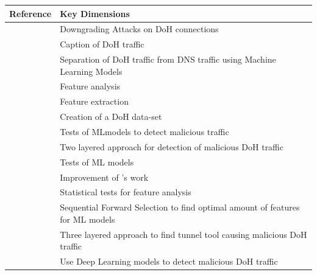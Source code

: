 \begin{center}
\begin{tabular}{ |c|l| }
\hline
Reference & Key Dimensions \\
\hline
 \cite{HuangEtAl_DoHDowngradeAttack} & Downgrading Attacks on DoH connections\\ 
 \hline
 \cite{Hjelm_ANewNeedle} & Caption of DoH traffic\\
 \hline
 \multirow{2}{*}{\cite{VeshkinEtAl_DoHInsightML}} & Separation of DoH traffic from DNS traffic using Machine Learning Models\\
 & Feature analysis\\
 \hline
 \multirow{2}{*}{\cite{montazerishatoori2020anomaly}} & Feature extraction \\ & Creation of a DoH data-set \\
 \hline
 \cite{SinghRoy_DetectingMalicousDoHTrafficML} & Tests of MLmodels to detect malicious traffic\\
 \hline
 \multirow{2}{*}{\cite{Banadaki_DetectingMalicousDoHTrafficinDNSUsingML}} & Two layered approach for detection of malicious DoH traffic\\
 & Tests of ML models\\
 \hline
 \multirow{3}{*}{\cite{BehnkeEtAl_FeatureEngineeringMLModelMaliciusDoHTraffic}} & Improvement of \cite{Banadaki_DetectingMalicousDoHTrafficinDNSUsingML}'s work\\
 & Statistical tests for feature analysis\\
 & Sequential Forward Selection to find optimal amount of features for ML models\\
 \hline
 \cite{MitsuhashiEtAl_IdentifyingmaliciousDNSTunnelTools} & Three layered approach to find tunnel tool causing malicious DoH traffic\\
 \hline
 \cite{AlFawaRehEtAl_DetectingMaliciousDNSQueriesBRNN} & Use Deep Learning models to detect malicious DoH traffic\\ 
\hline
\end{tabular}
 \label{tab:summary} 
\end{center}
